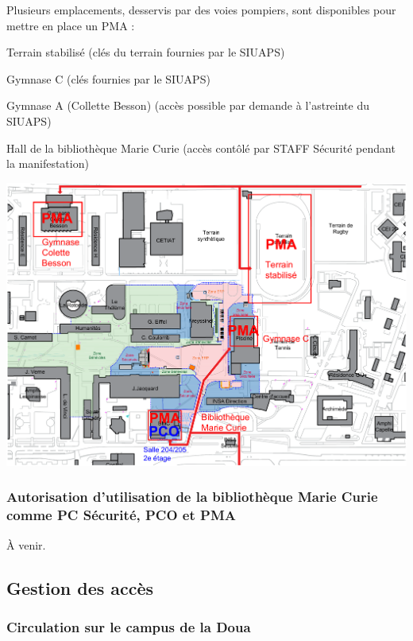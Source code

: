 \documentclass[hidelinks, paper=a4, fontsize=13pt]{report}
\begin{document}
Plusieurs emplacements, desservis par des voies pompiers, sont disponibles pour mettre en place un PMA :
\begin{list}{•}{}
	\item Terrain stabilisé (clés du terrain fournies par le SIUAPS)
	\item Gymnase C (clés fournies par le SIUAPS)
	\item Gymnase A (Collette Besson) (accès possible par demande à l’astreinte du SIUAPS)
	\item Hall de la bibliothèque Marie Curie (accès contôlé par STAFF Sécurité pendant la manifestation)
\end{list}
\begin{center}
	\includegraphics[width=.8\textwidth,keepaspectratio]{Exports/Plan_24h_44eme-PCO_PMA}
	\label{refEmplacementPMA}
\end{center}

\newpage


\subsubsection{Autorisation d’utilisation de la bibliothèque Marie Curie comme PC Sécurité, PCO et PMA}
À venir.
\begin{center}
\end{center}


\subsection{Gestion des accès}
\subsubsection{Circulation sur le campus de la Doua}
\label{refAccesCampus}
\end{document}
